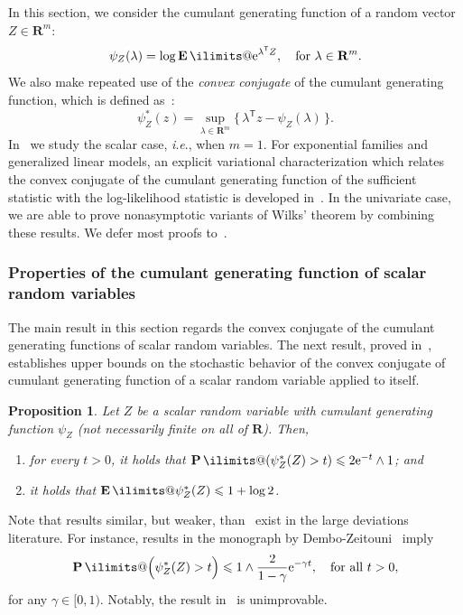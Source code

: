 \documentclass[11pt, letterpaper, hidelinks]{article}
\makeatletter
\newcommand{\R}{\mathbf R}
\newcommand{\twomin}[2]{\ensuremath{#1 \land #2}}
\newcommand{\e}{\mathrm{e}}
\newcommand{\1}{\mathbf 1}
\renewcommand{\leq}{\leqslant}
\newcommand{\T}{\mathsf{T}}
\newcommand{\E}{\operatorname*{\mathbf{E}}\ilimits@}
\renewcommand{\P}{\operatorname*{\mathbf{P}}\ilimits@}
\newcommand{\ie}{\textit{i}.\textit{e}., }
\theoremstyle{plain}
\newtheorem{proposition}{Proposition}[section]
\theoremstyle{definition}
\makeatother
\begin{document}
In this section, we consider the cumulant generating function of a random vector $Z \in \R^m$:
\[
\psi_Z(\lambda) = \log \E \e^{\lambda^\T Z}, \quad \mbox{for}~ \lambda \in \R^m.
\]
We also make repeated use of the \emph{convex conjugate} of the cumulant generating function, which is defined as~\cite[pp.~104]{rockafellar1970convex}:
\[
\psi_Z^\ast(z) = 
\sup_{\lambda \in \R^m} \Big\{\, 
\lambda^\T z - \psi_Z(\lambda)
\,\Big\}.
\]
In~ we study the scalar case, \ie when $m = 1$. For exponential families and generalized linear models, an explicit variational characterization which relates the convex conjugate of the cumulant generating function of the sufficient statistic with the log-likelihood statistic is developed in~. In the univariate case, we are able to prove nonasymptotic variants of Wilks' theorem by combining these results. We defer most proofs to~.


\subsubsection{Properties of the cumulant generating function of scalar random variables}
\label{sec:scalar-random-variables}

The main result in this section regards the convex conjugate of the cumulant generating functions of scalar random variables.
The next result, proved in~, establishes upper bounds on the stochastic behavior of the convex conjugate of cumulant generating function of a scalar random variable applied to itself. 
\begin{proposition}
\label{prop:conjugate-scalar-case}
Let $Z$ be a scalar random variable with cumulant generating function $\psi_Z$
(not necessarily finite on all of $\R$).
Then,
\begin{enumerate}[label=(\roman*)]
\item 
\label{item:deviation-for-ccgf}
for every $t > 0$, it holds that
	$\P(\psi_Z^*(Z) > t) \leq \twomin{2 \e^{-t}}{1}$; and
\item 
\label{item:mean-of-ccgf}
it holds that $\E \psi_Z^\ast(Z) \leq 1 + \log 2$. 
\end{enumerate}
\end{proposition}

Note that results similar, but weaker, than~ exist in the large deviations literature. For instance, results in the monograph by Dembo-Zeitouni~\cite[Eqn.~(5.1.16)]{dembo2010large} imply 
\[
\P\Big(\psi_Z^\ast(Z) > t\Big) \leq \twomin{1}{\frac{2}{1-\gamma}\e^{-\gamma t}}, \quad \mbox{for all}~t > 0,
\]
for any $\gamma \in [0, 1)$. Notably, the result in~ is unimprovable. 
\end{document}
